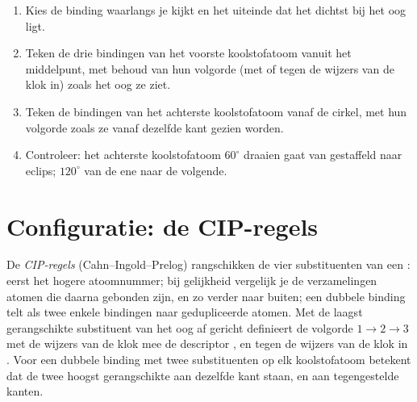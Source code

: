 \begin{method}\label{met:b1:stereochemistry-in-depth:newman-from-cram}
\begin{enumerate}
  \item Kies de binding waarlangs je kijkt en het uiteinde dat het dichtst
        bij het oog ligt.
  \item Teken de drie bindingen van het voorste koolstofatoom vanuit het
        middelpunt, met behoud van hun volgorde (met of tegen de wijzers
        van de klok in) zoals het oog ze ziet.
  \item Teken de bindingen van het achterste koolstofatoom vanaf de
        cirkel, met hun volgorde zoals ze vanaf dezelfde kant gezien
        worden.
  \item Controleer: het achterste koolstofatoom $60^\circ$ draaien gaat van
        gestaffeld naar eclips; $120^\circ$ van de ene  naar de volgende.
\end{enumerate}
\end{method}

\section{Configuratie: de CIP-regels}

\begin{definition}\label{def:b1:stereochemistry-in-depth:cip}
De \emph{CIP-regels} (Cahn--Ingold--Prelog) rangschikken
de vier substituenten van een : eerst het hogere
atoomnummer; bij gelijkheid vergelijk je de verzamelingen atomen die
daarna gebonden zijn, en zo verder naar buiten; een dubbele binding telt
als twee enkele bindingen naar gedupliceerde atomen. Met de laagst
gerangschikte substituent van het oog af gericht definieert de volgorde
$1 \to 2 \to 3$ met de wijzers van de klok mee de descriptor , en
tegen de wijzers van de klok in . Voor een dubbele binding met
twee substituenten op elk koolstofatoom betekent  dat de twee
hoogst gerangschikte aan dezelfde kant staan, en  aan
tegengestelde kanten.
\end{definition}

